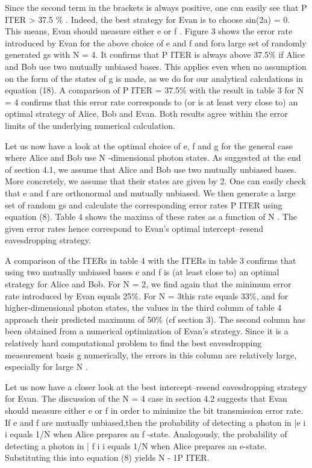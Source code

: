 Since the second term in the brackets is always positive, one can easily see that P ITER > 37.5 \% .
Indeed, the best strategy for Evan is to choose sin(2a) = 0. This means, Evan should measure either e or f .
Figure 3 shows the error rate introduced by Evan for the above choice of e and f and fora large set of randomly generated gs with N = 4. It confirms that P ITER is always above 37.5\% if Alice and Bob use two mutually unbiased bases. This applies even when no assumption on the form of the states of g is made, as we do for our analytical calculations in equation (18). A comparison of P ITER = 37.5\% with the result in table 3 for N = 4 confirms that this error rate corresponds to (or is at least very close to) an optimal strategy of Alice, Bob and Evan. Both results agree within the error limits of the underlying numerical calculation.

Let us now have a look at the optimal choice of e, f and g for the general case where Alice and Bob use N -dimensional photon states. As suggested at the end of section 4.1, we assume that Alice and Bob use two mutually unbiased bases. More concretely, we assume that their states are given by 2. One can easily check that e and f are orthonormal and mutually unbiased. We then generate a large set of random gs and calculate the corresponding error rates P ITER using equation (8). Table 4 shows the maxima of these rates as a function of N . The given error rates hence correspond to Evan’s optimal intercept–resend eavesdropping strategy.

A comparison of the ITERs in table 4 with the ITERs in table 3 confirms that using two mutually unbiased bases e and f is (at least close to) an optimal strategy for Alice and Bob. For N = 2, we find again that the minimum error rate introduced by Evan equals 25\%. For N = 3this rate equals 33\%, and for higher-dimensional photon states, the values in the third column of table 4 approach their predicted maximum of 50\% (cf section 3). The second column has been obtained from a numerical optimization of Evan’s strategy. Since it is a relatively hard computational problem to find the best eavesdropping measurement basis g numerically, the errors in this column are relatively large, especially for large N .


Let us now have a closer look at the best intercept–resend eavesdropping strategy for Evan. The discussion of the N = 4 case in section 4.2 suggests that Evan should measure either e or f in order to minimize the bit transmission error rate. If e and f are mutually unbiased,then the probability of detecting a photon in |e i i equals 1/N when Alice prepares an f -state. Analogously, the probability of detecting a photon in | f i i equals 1/N when Alice prepares an e-state. Substituting this into equation (8) yields N - 1P ITER.

